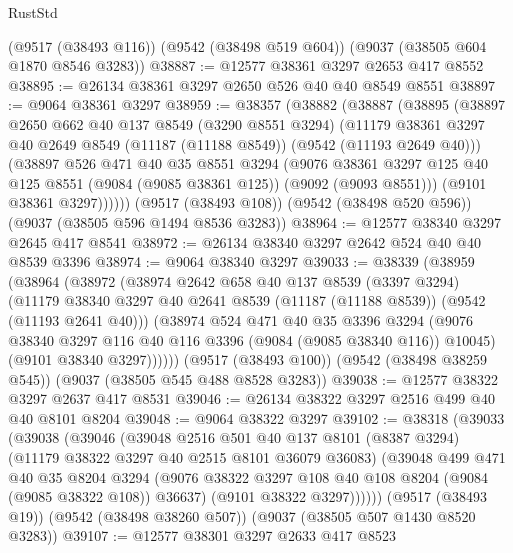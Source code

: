 \begin{lexlean}{RustStd}
\begin{coremodule}
    (@9517 (@38493 @116))
    (@9542 (@38498 @519 @604))
    (@9037 (@38505 @604 @1870 @8546 @3283))
@38887 := @12577 @38361 @3297 @2653 @417 @8552
@38895 := @26134 @38361 @3297 @2650 @526 @40 @40 @8549 @8551
@38897 := @9064 @38361 @3297
@38959 := @38357
    (@38882
      (@38887
        (@38895
          (@38897
            @2650
            @662
            @40
            @137
            @8549
            (@3290 @8551 @3294)
            (@11179 @38361 @3297 @40 @2649 @8549 (@11187 (@11188 @8549)) (@9542 (@11193 @2649 @40)))
            (@38897
              @526
              @471
              @40
              @35
              @8551
              @3294
              (@9076
                @38361
                @3297
                @125
                @40
                @125
                @8551
                (@9084 (@9085 @38361 @125))
                (@9092 (@9093 @8551)))
              (@9101 @38361 @3297))))))
    (@9517 (@38493 @108))
    (@9542 (@38498 @520 @596))
    (@9037 (@38505 @596 @1494 @8536 @3283))
@38964 := @12577 @38340 @3297 @2645 @417 @8541
@38972 := @26134 @38340 @3297 @2642 @524 @40 @40 @8539 @3396
@38974 := @9064 @38340 @3297
@39033 := @38339
    (@38959
      (@38964
        (@38972
          (@38974
            @2642
            @658
            @40
            @137
            @8539
            (@3397 @3294)
            (@11179 @38340 @3297 @40 @2641 @8539 (@11187 (@11188 @8539)) (@9542 (@11193 @2641 @40)))
            (@38974
              @524
              @471
              @40
              @35
              @3396
              @3294
              (@9076 @38340 @3297 @116 @40 @116 @3396 (@9084 (@9085 @38340 @116)) @10045)
              (@9101 @38340 @3297))))))
    (@9517 (@38493 @100))
    (@9542 (@38498 @38259 @545))
    (@9037 (@38505 @545 @488 @8528 @3283))
@39038 := @12577 @38322 @3297 @2637 @417 @8531
@39046 := @26134 @38322 @3297 @2516 @499 @40 @40 @8101 @8204
@39048 := @9064 @38322 @3297
@39102 := @38318
    (@39033
      (@39038
        (@39046
          (@39048
            @2516
            @501
            @40
            @137
            @8101
            (@8387 @3294)
            (@11179 @38322 @3297 @40 @2515 @8101 @36079 @36083)
            (@39048
              @499
              @471
              @40
              @35
              @8204
              @3294
              (@9076 @38322 @3297 @108 @40 @108 @8204 (@9084 (@9085 @38322 @108)) @36637)
              (@9101 @38322 @3297))))))
    (@9517 (@38493 @19))
    (@9542 (@38498 @38260 @507))
    (@9037 (@38505 @507 @1430 @8520 @3283))
@39107 := @12577 @38301 @3297 @2633 @417 @8523

\end{coremodule}
\end{lexlean}
